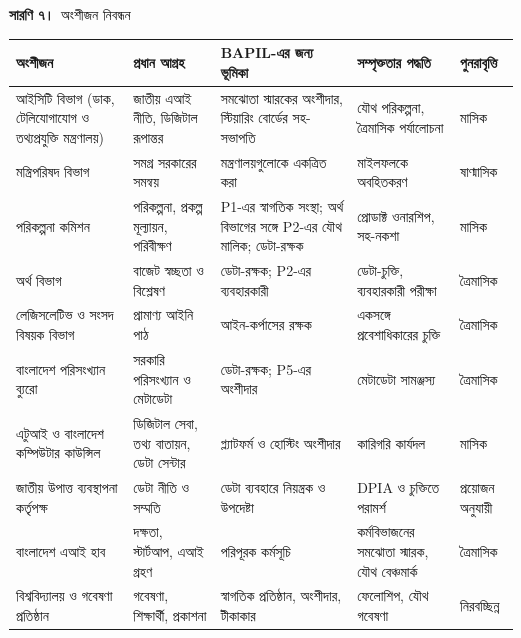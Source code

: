 \documentclass[border=10pt]{standalone}
\begin{document}
\begin{minipage}{17cm}
{\large\bfseries সারণি ৭।}\ {\large অংশীজন নিবন্ধন}\par\vspace{7pt}
\small
{}
\begin{tabularx}{\linewidth}{@{}>{\hsize=1.042\hsize\raggedright\arraybackslash}X>{\hsize=1.198\hsize\raggedright\arraybackslash}X>{\hsize=0.938\hsize\raggedright\arraybackslash}X>{\hsize=1.250\hsize\raggedright\arraybackslash}X>{\hsize=0.573\hsize\raggedright\arraybackslash}X@{}}
\arrayrulecolor{bapilrule}\toprule
\rowcolor{white}\textbf{অংশীজন} & \textbf{প্রধান আগ্রহ} & \textbf{BAPIL-এর জন্য ভূমিকা} & \textbf{সম্পৃক্ততার পদ্ধতি} & \textbf{পুনরাবৃত্তি} \\
\midrule
আইসিটি বিভাগ (ডাক, টেলিযোগাযোগ ও তথ্যপ্রযুক্তি মন্ত্রণালয়) & জাতীয় এআই নীতি, ডিজিটাল রূপান্তর & সমঝোতা স্মারকের অংশীদার, স্টিয়ারিং বোর্ডের সহ-সভাপতি & যৌথ পরিকল্পনা, ত্রৈমাসিক পর্যালোচনা & মাসিক \\
মন্ত্রিপরিষদ বিভাগ & সমগ্র সরকারের সমন্বয় & মন্ত্রণালয়গুলোকে একত্রিত করা & মাইলফলকে অবহিতকরণ & ষাণ্মাসিক \\
পরিকল্পনা কমিশন & পরিকল্পনা, প্রকল্প মূল্যায়ন, পরিবীক্ষণ & P1-এর স্বাগতিক সংস্থা; অর্থ বিভাগের সঙ্গে P2-এর যৌথ মালিক; ডেটা-রক্ষক & প্রোডাক্ট ওনারশিপ, সহ-নকশা & মাসিক \\
অর্থ বিভাগ & বাজেট স্বচ্ছতা ও বিশ্লেষণ & ডেটা-রক্ষক; P2-এর ব্যবহারকারী & ডেটা-চুক্তি, ব্যবহারকারী পরীক্ষা & ত্রৈমাসিক \\
লেজিসলেটিভ ও সংসদ বিষয়ক বিভাগ & প্রামাণ্য আইনি পাঠ & আইন-কর্পাসের রক্ষক & একসঙ্গে প্রবেশাধিকারের চুক্তি & ত্রৈমাসিক \\
বাংলাদেশ পরিসংখ্যান ব্যুরো & সরকারি পরিসংখ্যান ও মেটাডেটা & ডেটা-রক্ষক; P5-এর অংশীদার & মেটাডেটা সামঞ্জস্য & ত্রৈমাসিক \\
এটুআই ও বাংলাদেশ কম্পিউটার কাউন্সিল & ডিজিটাল সেবা, তথ্য বাতায়ন, ডেটা সেন্টার & প্ল্যাটফর্ম ও হোস্টিং অংশীদার & কারিগরি কার্যদল & মাসিক \\
জাতীয় উপাত্ত ব্যবস্থাপনা কর্তৃপক্ষ & ডেটা নীতি ও সম্মতি & ডেটা ব্যবহারে নিয়ন্ত্রক ও উপদেষ্টা & DPIA ও চুক্তিতে পরামর্শ & প্রয়োজন অনুযায়ী \\
বাংলাদেশ এআই হাব & দক্ষতা, স্টার্টআপ, এআই গ্রহণ & পরিপূরক কর্মসূচি & কর্মবিভাজনের সমঝোতা স্মারক, যৌথ বেঞ্চমার্ক & ত্রৈমাসিক \\
বিশ্ববিদ্যালয় ও গবেষণা প্রতিষ্ঠান & গবেষণা, শিক্ষার্থী, প্রকাশনা & স্বাগতিক প্রতিষ্ঠান, অংশীদার, টীকাকার & ফেলোশিপ, যৌথ গবেষণা & নিরবচ্ছিন্ন \\

\end{tabularx}
\end{minipage}
\end{document}
